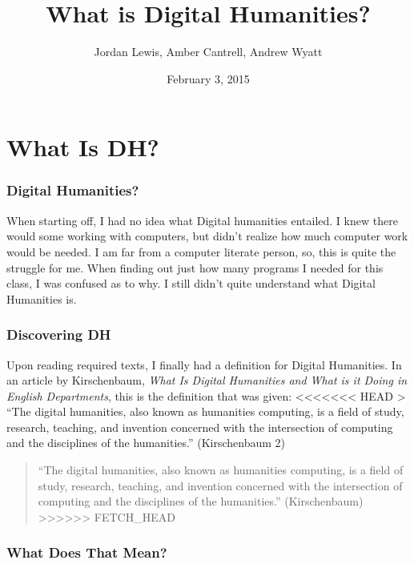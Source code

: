 \documentclass[]{article}
\title{What is Digital Humanities?}
\author{Jordan Lewis, Amber Cantrell, Andrew Wyatt}
\date{February 3, 2015}
\begin{document}
\maketitle

\section{What Is DH?}\label{what-is-dh}

\subsubsection{Digital Humanities?}\label{digital-humanities}

When starting off, I had no idea what Digital humanities entailed. I
knew there would some working with computers, but didn't realize how
much computer work would be needed. I am far from a computer literate
person, so, this is quite the struggle for me. When finding out just how
many programs I needed for this class, I was confused as to why. I still
didn't quite understand what Digital Humanities is.

\subsubsection{Discovering DH}\label{discovering-dh}

Upon reading required texts, I finally had a definition for Digital
Humanities. In an article by Kirschenbaum, \emph{What Is Digital
Humanities and What is it Doing in English Departments}, this is the
definition that was given:
\textless{}\textless{}\textless{}\textless{}\textless{}\textless{}\textless{}
HEAD \textgreater{} ``The digital humanities, also known as humanities
computing, is a field of study, research, teaching, and invention
concerned with the intersection of computing and the disciplines of the
humanities.'' (Kirschenbaum 2)

\begin{quote}
``The digital humanities, also known as humanities computing, is a field
of study, research, teaching, and invention concerned with the
intersection of computing and the disciplines of the humanities.''
(Kirschenbaum)
\textgreater{}\textgreater{}\textgreater{}\textgreater{}\textgreater{}\textgreater{}
FETCH\_HEAD
\end{quote}

\subsubsection{What Does That Mean?}\label{what-does-that-mean}
\end{document}
